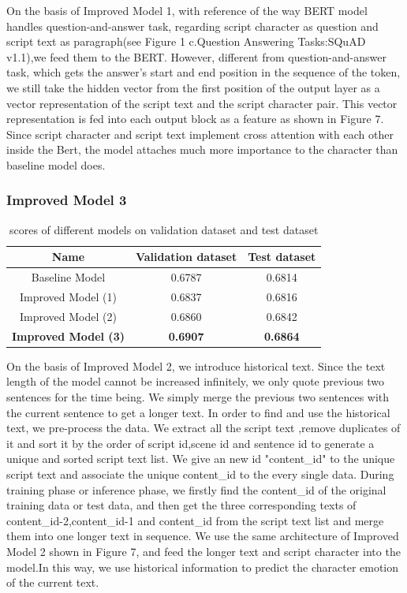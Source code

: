\documentclass[12pt,twocolumn,letterpaper]{article}
\begin{document}
 On the basis of Improved Model 1, with reference of the way BERT model handles question-and-answer task, regarding script character as question and script text as paragraph(see Figure 1 c.Question Answering Tasks:SQuAD v1.1),we feed them to the BERT. However, different from question-and-answer task, which gets the answer's start and end position in the sequence of the token, we still take the hidden vector from the first position of the output layer as a vector representation of the script text and the script character pair. This vector representation is fed into each output block as a feature as shown in Figure 7. Since script character and script text implement cross attention with each other inside the Bert, the model attaches much more importance to the character than baseline model does.  
\subsubsection{Improved Model 3}

\begin{table}
\begin{center}
\begin{tabular}{|c|c|c|}
\hline
Name & Validation dataset  & Test dataset\\
\hline 
Baseline Model & 0.6787 & 0.6814\\
\hline 
Improved Model (1) & 0.6837 & 0.6816\\
\hline 
Improved Model (2) & 0.6860 & 0.6842\\
\hline 
\bf Improved Model (3) & \bf 0.6907 & \bf 0.6864\\
\hline 
\end{tabular}
\end{center}
\caption{scores of different models on validation dataset and test dataset}
\end{table}


On the basis of Improved Model 2, we introduce historical text. Since the text length of the model cannot be increased infinitely, we only quote previous two sentences for the time being. We simply merge the previous two sentences with the current sentence to get a longer text. 
In order to find and use the historical text, we pre-process the data. We extract all the script text ,remove duplicates of it and sort it by the order of script id,scene id and sentence id to generate a unique and sorted script text list. We give an new id "content\_id" to the unique script text and associate the unique content\_id to the every single data. During training phase or inference phase, we firstly find the content\_id of the original training data or test data, and then get the three corresponding texts of content\_id-2,content\_id-1 and content\_id from the script text list and merge them into one longer text in sequence. We use the same architecture of Improved Model 2 shown in Figure 7, and feed the longer text and script character into the model.In this way, we use historical information to predict the character emotion of the current text. 
\end{document}
